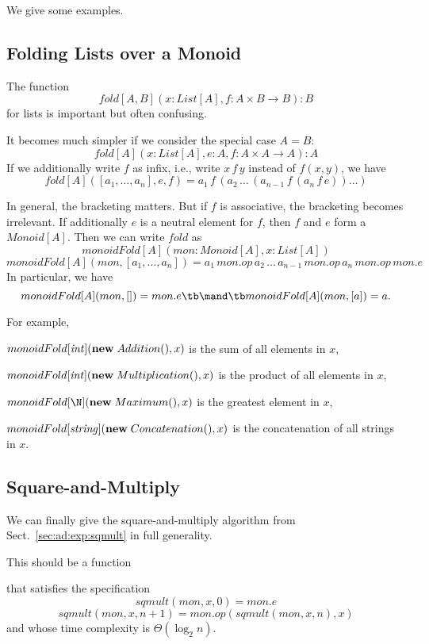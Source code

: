 We give some examples.

\subsection{Folding Lists over a Monoid}\label{sec:ad:monoidfold}

The function \[fold[A,B](x:List[A], f: A\times B\to B): B\] for lists is important but often confusing.

It becomes much simpler if we consider the special case $A=B$:
\[fold[A](x:List[A], e: A, f: A\times A\to A): A\]
If we additionally write $f$ as infix, i.e., write $x\,f\,y$ instead of $f(x,y)$, we have
\[fold[A]([a_1,\ldots,a_n],e,f)=a_1\,f\,(a_2\,\ldots\,(a_{n-1}\,f\,(a_n\,f\, e))\ldots)\]

In general, the bracketing matters.
But if $f$ is associative, the bracketing becomes irrelevant.
If additionally $e$ is a neutral element for $f$, then $f$ and $e$ form a $Monoid[A]$.
Then we can write $fold$ as
\[monoidFold[A](mon:Monoid[A], x:List[A])\]
\[monoidFold[A](mon, [a_1,\ldots,a_n])=a_1\,mon.op\,a_2\,\ldots\,a_{n-1}\,mon.op\,a_n\,mon.op\, mon.e\]
In particular, we have
\[monoidFold[A](mon, [])=mon.e \tb\mand\tb monoidFold[A](mon, [a])=a.\]

For example,
\begin{compactitem}
\item $monoidFold[\mathit{int}]({\rm \bf new}\; Addition(), x)$ is the sum of all elements in $x$,
\item $monoidFold[\mathit{int}]({\rm \bf new}\; Multiplication(), x)$ is the product of all elements in $x$,
\item $monoidFold[\N](\anew{Maximum}{}, x)$ is the greatest element in $x$,
\item $monoidFold[\mathit{string}]({\rm \bf new}\; Concatenation(), x)$ is the concatenation of all strings in $x$.
\end{compactitem}

\subsection{Square-and-Multiply}

We can finally give the square-and-multiply algorithm from Sect.~\ref{sec:ad:exp:sqmult} in full generality.

This should be a function
\begin{acode}
\end{acode}
that satisfies the specification
\[sqmult(mon, x, 0)=mon.e\]
\[sqmult(mon, x, n+1)=mon.op(sqmult(mon, x, n), x)\]
and whose time complexity is $\Theta(\log_2 n)$.

